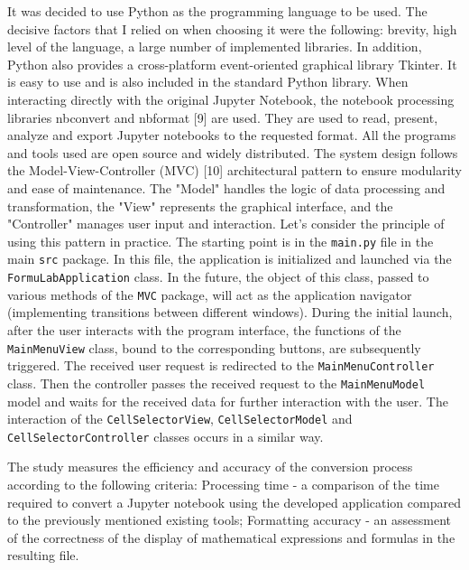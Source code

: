 \documentclass{article}
\begin{document}
\begin{multicols}{2}
It was decided to use Python as the programming language to be used. The decisive factors that I relied on when choosing it were the following: brevity, high level of the language, a large number of implemented libraries. In addition, Python also provides a cross-platform event-oriented graphical library Tkinter. It is easy to use and is also included in the standard Python library. When interacting directly with the original Jupyter Notebook, the notebook processing libraries nbconvert and nbformat [9] are used. They are used to read, present, analyze and export Jupyter notebooks to the requested format. All the programs and tools used are open source and widely distributed. The system design follows the Model-View-Controller (MVC) [10] architectural pattern to ensure modularity and ease of maintenance. The "Model" handles the logic of data processing and transformation, the "View" represents the graphical interface, and the "Controller" manages user input and interaction. Let's consider the principle of using this pattern in practice. The starting point is in the \texttt{main.py} file in the main \texttt{src} package. In this file, the application is initialized and launched via the \texttt{FormuLabApplication} class. In the future, the object of this class, passed to various methods of the \texttt{MVC} package, will act as the application navigator (implementing transitions between different windows). During the initial launch, after the user interacts with the program interface, the functions of the \texttt{MainMenuView} class, bound to the corresponding buttons, are subsequently triggered. The received user request is redirected to the \texttt{MainMenuController} class. Then the controller passes the received request to the \texttt{MainMenuModel} model and waits for the received data for further interaction with the user. The interaction of the \texttt{CellSelectorView}, \texttt{CellSelectorModel} and \texttt{CellSelectorController} classes occurs in a similar way.

The study measures the efficiency and accuracy of the conversion process according to the following criteria:
Processing time - a comparison of the time required to convert a Jupyter notebook using the developed application compared to the previously mentioned existing tools;
Formatting accuracy - an assessment of the correctness of the display of mathematical expressions and formulas in the resulting file.


\end{multicols}
\end{document}
